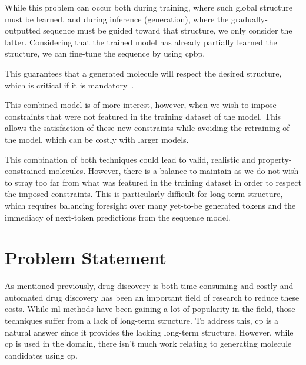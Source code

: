 \documentclass[../Document.tex]{subfiles}
\begin{document}
While this problem can occur both during training, where such global structure must be learned, and during inference (generation), where the gradually-outputted sequence must be guided toward that structure, we only consider the latter.
Considering that the trained model has already partially learned the structure, we can fine-tune the sequence by using \gls{cpbp}.

This guarantees that a generated molecule will respect the desired structure, which is critical if it is mandatory~\cite{deutsch2019general,lee2019gradient}.

This combined model is of more interest, however, when we wish to impose constraints that were not featured in the training dataset of the model. This allows the satisfaction of these new constraints while avoiding the retraining of the model, which can be costly with larger models.

This combination of both techniques could lead to valid, realistic and property-constrained molecules. However, there is a balance to maintain as we do not wish to stray too far from what was featured in the training dataset in order to respect the imposed constraints. This is particularly difficult for long-term structure, which requires balancing foresight over many yet-to-be generated tokens and the immediacy of next-token predictions from the sequence model.















\section{Problem Statement}
\label{sec:intro/problem}

As mentioned previously, drug discovery is both time-consuming and costly and automated drug discovery has been an important field of research to reduce these costs.
While \gls{ml} methods have been gaining a lot of popularity in the field, those techniques suffer from a lack of long-term structure.
To address this, \gls{cp} is a natural answer since it provides the lacking long-term structure.
However, while \gls{cp} is used in the domain, there isn't much work  relating to generating molecule candidates using \gls{cp}.
\end{document}
